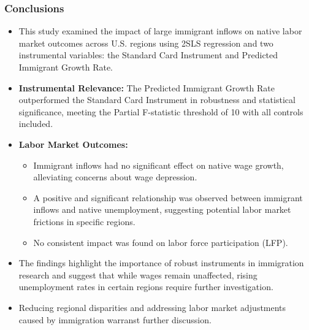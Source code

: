 \begin{frame}
    \frametitle{Conclusions}
    \begin{itemize}
        \item This study examined the impact of large immigrant inflows on native labor market outcomes across U.S. regions using 2SLS regression and two instrumental variables: the Standard Card Instrument and Predicted Immigrant Growth Rate.
        \item \textbf{Instrumental Relevance:} The Predicted Immigrant Growth Rate outperformed the Standard Card Instrument in robustness and statistical significance, meeting the Partial F-statistic threshold of 10 with all controls included.
        \item \textbf{Labor Market Outcomes:}
        \begin{itemize}
            \item Immigrant inflows had no significant effect on native wage growth, alleviating concerns about wage depression.
            \item A positive and significant relationship was observed between immigrant inflows and native unemployment, suggesting potential labor market frictions in specific regions.
            \item No consistent impact was found on labor force participation (LFP).
        \end{itemize}
        \item The findings highlight the importance of robust instruments in immigration research and suggest that while wages remain unaffected, rising unemployment rates in certain regions require further investigation.
        \item Reducing regional disparities and addressing labor market adjustments caused by immigration warranst further discussion.
    \end{itemize}
\end{frame}

